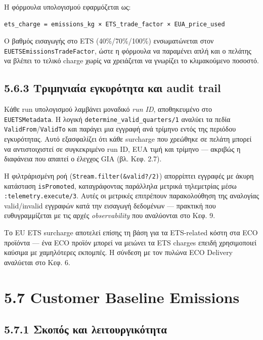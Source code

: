 Η φόρμουλα υπολογισμού εφαρμόζεται ως:

\begin{verbatim}
ets_charge = emissions_kg × ETS_trade_factor × EUA_price_used
\end{verbatim}

Ο βαθμός εισαγωγής στο ETS (40\%/70\%/100\%) ενσωματώνεται στον
\texttt{EUETSEmissionsTradeFactor}, ώστε η φόρμουλα να παραμένει απλή
και ο πελάτης να βλέπει το τελικό charge χωρίς να χρειάζεται να γνωρίζει
το κλιμακούμενο ποσοστό.

\subsection{5.6.3 Τριμηνιαία εγκυρότητα και audit
trail}\label{ux3c4ux3c1ux3b9ux3bcux3b7ux3bdux3b9ux3b1ux3afux3b1-ux3b5ux3b3ux3baux3c5ux3c1ux3ccux3c4ux3b7ux3c4ux3b1-ux3baux3b1ux3b9-audit-trail}

Κάθε run υπολογισμού λαμβάνει μοναδικό \emph{run ID}, αποθηκευμένο στο
\texttt{EUETSMetadata}. Η λογική \texttt{determine\_valid\_quarters/1}
αναλύει τα πεδία \texttt{ValidFrom}/\texttt{ValidTo} και παράγει μια
εγγραφή ανά τρίμηνο εντός της περιόδου εγκυρότητας. Αυτό εξασφαλίζει ότι
κάθε surcharge που χρεώθηκε σε πελάτη μπορεί να αντιστοιχιστεί σε
συγκεκριμένο run ID, EUA τιμή και τρίμηνο --- ακριβώς η διαφάνεια που
απαιτεί ο έλεγχος GIA (βλ. Κεφ. 2.7).

Η φιλτράρισμένη ροή (\texttt{Stream.filter(\&valid?/2)}) απορρίπτει
εγγραφές με άκυρη κατάσταση \texttt{isPromoted}, καταγράφοντας παράλληλα
μετρικά τηλεμετρίας μέσω \texttt{:telemetry.execute/3}. Αυτές οι
μετρικές επιτρέπουν παρακολούθηση της αναλογίας valid/invalid εγγραφών
κατά την εισαγωγή δεδομένων --- πρακτική που ευθυγραμμίζεται με τις
αρχές \emph{observability} που αναλύονται στο Κεφ. 9.

Το EU ETS surcharge αποτελεί επίσης τη βάση για τα ETS-related κόστη στα
ECO προϊόντα --- ένα ECO προϊόν μπορεί να μειώνει τα ETS charges επειδή
χρησιμοποιεί καύσιμα με χαμηλότερες εκπομπές. Η σύνδεση με τον πυλώνα
ECO Delivery αναλύεται στο Κεφ. 6.

\section{5.7 Customer Baseline
Emissions}\label{customer-baseline-emissions}

\subsection{5.7.1 Σκοπός και
λειτουργικότητα}\label{ux3c3ux3baux3bfux3c0ux3ccux3c2-ux3baux3b1ux3b9-ux3bbux3b5ux3b9ux3c4ux3bfux3c5ux3c1ux3b3ux3b9ux3baux3ccux3c4ux3b7ux3c4ux3b1}

